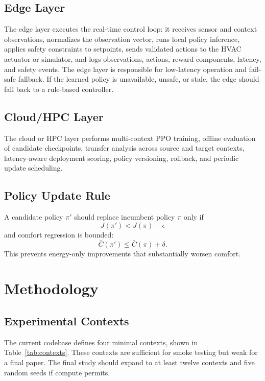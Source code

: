\documentclass[11pt,a4paper]{article}
\begin{document}
\subsection{Edge Layer}

The edge layer executes the real-time control loop: it receives sensor and context observations, normalizes the observation vector, runs local policy inference, applies safety constraints to setpoints, sends validated actions to the HVAC actuator or simulator, and logs observations, actions, reward components, latency, and safety events. The edge layer is responsible for low-latency operation and fail-safe fallback. If the learned policy is unavailable, unsafe, or stale, the edge should fall back to a rule-based controller.

\subsection{Cloud/HPC Layer}

The cloud or HPC layer performs multi-context PPO training, offline evaluation of candidate checkpoints, transfer analysis across source and target contexts, latency-aware deployment scoring, policy versioning, rollback, and periodic update scheduling.

\subsection{Policy Update Rule}

A candidate policy $\pi'$ should replace incumbent policy $\pi$ only if
\begin{equation}
J(\pi') < J(\pi) - \epsilon
\end{equation}
and comfort regression is bounded:
\begin{equation}
\bar{C}(\pi') \leq \bar{C}(\pi) + \delta.
\end{equation}
This prevents energy-only improvements that substantially worsen comfort.

\section{Methodology}

\subsection{Experimental Contexts}

The current codebase defines four minimal contexts, shown in Table~\ref{tab:contexts}. These contexts are sufficient for smoke testing but weak for a final paper. The final study should expand to at least twelve contexts and five random seeds if compute permits.
\end{document}
